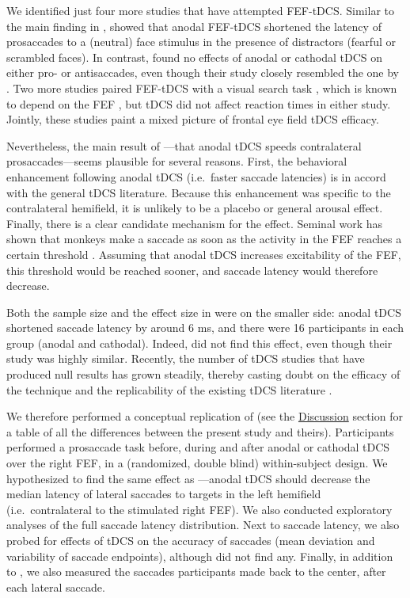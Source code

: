 \documentclass[11pt,english,]{memoir}
\begin{document}
We identified just four more studies that have attempted FEF-tDCS. Similar to the main finding in \textcite{Kanai2012}, \textcite{Tseng2014} showed that anodal FEF-tDCS shortened the latency of prosaccades to a (neutral) face stimulus in the presence of distractors (fearful or scrambled faces). In contrast, \textcite{Chen2017} found no effects of anodal or cathodal tDCS on either pro- or antisaccades, even though their study closely resembled the one by \textcite{Kanai2012}. Two more studies paired FEF-tDCS with a visual search task \autocites{Ball2013}{Ellison2017}, which is known to depend on the FEF \autocite{Reynolds2004}, but tDCS did not affect reaction times in either study. Jointly, these studies paint a mixed picture of frontal eye field tDCS efficacy.

Nevertheless, the main result of \textcite{Kanai2012}---that anodal tDCS speeds contralateral prosaccades---seems plausible for several reasons. First, the behavioral enhancement following anodal tDCS (i.e.~faster saccade latencies) is in accord with the general tDCS literature. Because this enhancement was specific to the contralateral hemifield, it is unlikely to be a placebo or general arousal effect. Finally, there is a clear candidate mechanism for the effect. Seminal work has shown that monkeys make a saccade as soon as the activity in the FEF reaches a certain threshold \autocite{Hanes1996}. Assuming that anodal tDCS increases excitability of the FEF, this threshold would be reached sooner, and saccade latency would therefore decrease.

Both the sample size and the effect size in \textcite{Kanai2012} were on the smaller side: anodal tDCS shortened saccade latency by around 6 ms, and there were 16 participants in each group (anodal and cathodal). Indeed, \textcite{Chen2017} did not find this effect, even though their study was highly similar. Recently, the number of tDCS studies that have produced null results has grown steadily, thereby casting doubt on the efficacy of the technique and the replicability of the existing tDCS literature \autocites{Horvath2014b}{Horvath2015}{Medina2017}.

We therefore performed a conceptual replication of \textcite{Kanai2012} (see the \protect\hyperlink{sacc_tDCS-discussion}{Discussion} section for a table of all the differences between the present study and theirs). Participants performed a prosaccade task before, during and after anodal or cathodal tDCS over the right FEF, in a (randomized, double blind) within-subject design. We hypothesized to find the same effect as \textcite{Kanai2012}---anodal tDCS should decrease the median latency of lateral saccades to targets in the left hemifield (i.e.~contralateral to the stimulated right FEF). We also conducted exploratory analyses of the full saccade latency distribution. Next to saccade latency, we also probed for effects of tDCS on the accuracy of saccades (mean deviation and variability of saccade endpoints), although \textcite{Kanai2012} did not find any. Finally, in addition to \textcite{Kanai2012}, we also measured the saccades participants made back to the center, after each lateral saccade.
\end{document}
